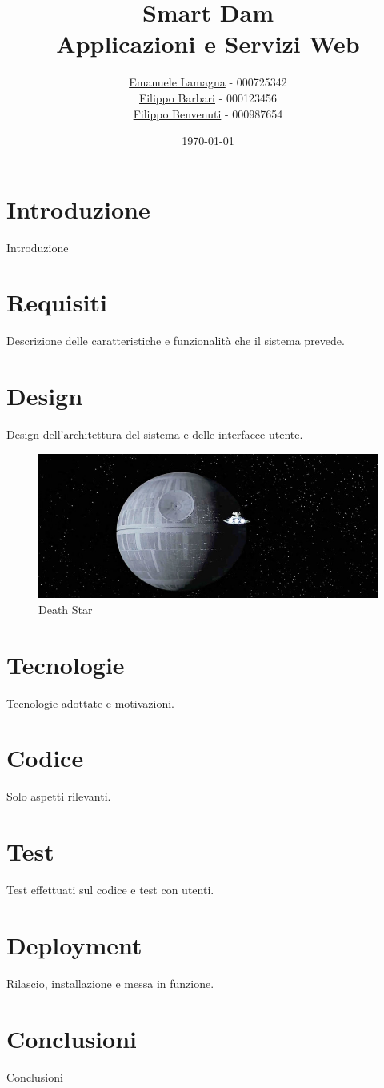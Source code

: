 \documentclass{report}
\title{
    Smart Dam \\
    \large Applicazioni e Servizi Web
}
\author{\href{mailto:emalama@studio.unibo.it}{Emanuele Lamagna} - 000725342\\\href{mailto:filippo.barbari@studio.unibo.it}{Filippo Barbari} - 000123456\\\href{mailto:filippo.benvenuti3@studio.unibo.it}{Filippo Benvenuti} - 000987654}
\date{\today}
\begin{document}
\maketitle
\section{Introduzione}
Introduzione \citep{adams1995hitchhiker}

\section{Requisiti}
Descrizione delle caratteristiche e funzionalità che il sistema prevede. 

\section{Design}
Design dell'architettura del sistema e delle interfacce utente.

\begin{figure}[h!]
\centering
\includegraphics[scale=0.44]{deathStar2.jpg}
\caption{Death Star}
\label{fig:deathstar}
\end{figure}

\section{Tecnologie}
Tecnologie adottate e motivazioni.

\section{Codice}
Solo aspetti rilevanti.

\section{Test}
Test effettuati sul codice e test con utenti.

\section{Deployment}
Rilascio, installazione e messa in funzione.


\section{Conclusioni}
Conclusioni



\end{document}
